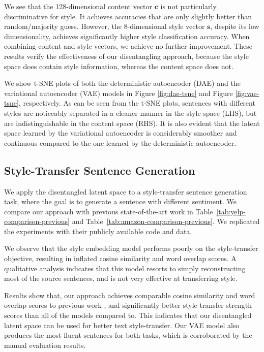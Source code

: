 \documentclass[letterpaper]{article} %
\begin{document}
We see that the 128-dimensional content vector $\bm c$ is not particularly discriminative for style.
It achieves accuracies that are only slightly better than random/majority guess.
However, the 8-dimensional style vector $\bm s$, despite its low dimensionality, achieves significantly higher style classification accuracy.
When combining content and style vectors, we achieve no further improvement.
These results verify the effectiveness of our disentangling approach, because the style space does contain style information, whereas the content space does not.

We show t-SNE plots of both the deterministic autoencoder (DAE) and the variational autoencoder (VAE) models in Figure \ref{fig:dae-tsne} and Figure \ref{fig:vae-tsne}, respectively.
As can be seen from the t-SNE plots, sentences with different styles are noticeably separated in a cleaner manner in the style space (LHS), but are indistinguishable in the content space (RHS).
It is also evident that the latent space learned by the variational autoencoder is considerably smoother and continuous compared to the one learned by the deterministic autoencoder.


\subsection{Style-Transfer Sentence Generation}

We apply the disentangled latent space to a style-transfer sentence generation task, where the goal is to generate a sentence with different sentiment.
We compare our approach with previous state-of-the-art work in Table~\ref{tab:yelp-comparison-previous} and Table~\ref{tab:amazon-comparison-previous}.
We replicated the experiments with their publicly available code and data.


We observe that the style embedding model \cite{fu2017style} performs poorly on the style-transfer objective, resulting in inflated cosine similarity and word overlap scores.
A qualitative analysis indicates that this model resorts to simply reconstructing most of the source sentences, and is not very effective at transferring style.

Results show that, our approach achieves comparable cosine similarity and word overlap scores to previous work \cite{shen2017style,zhao2018adversarially}, and significantly better style-transfer strength scores than all of the models compared to. This indicates that our disentangled latent space can be used for better text style-transfer.
Our VAE model also produces the most fluent sentences for both tasks, which is corroborated by the manual evaluation results.
\end{document}
